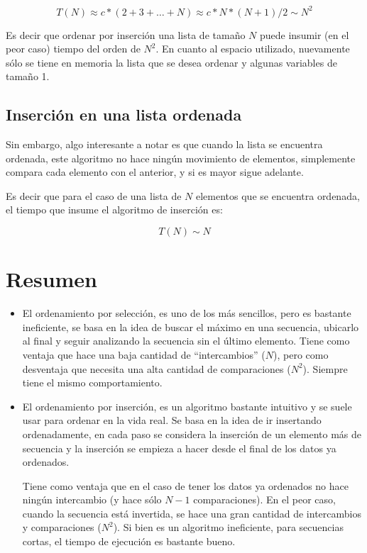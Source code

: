 \begin{equation}
T(N) \approx c * (2 + 3 + \ldots + N) \approx c * N * (N+1)/2 \sim N^2
\end{equation}

Es decir que ordenar por inserción una lista de tamaño $N$ puede insumir
(en el peor caso) tiempo del orden de $N^2$. En cuanto al espacio
utilizado, nuevamente sólo se tiene en memoria la lista que se desea
ordenar y algunas variables de tamaño 1.

\subsection{Inserción en una lista ordenada}

Sin embargo, algo interesante a notar es que cuando la lista se encuentra
ordenada, este algoritmo no hace ningún movimiento de elementos,
simplemente compara cada elemento con el anterior, y si es mayor sigue
adelante.

Es decir que para el caso de una lista de $N$ elementos que se encuentra
ordenada, el tiempo que insume el algoritmo de inserción es:

\begin{equation}
T(N) \sim N
\end{equation}


\section{Resumen}

\begin{itemize}

\item El ordenamiento por selección, es uno de los más sencillos, pero es
bastante ineficiente, se basa en la idea de buscar el máximo en una secuencia,
ubicarlo al final y seguir analizando la secuencia sin el último elemento.
Tiene como ventaja que hace una baja cantidad de ``intercambios'' ($N$), pero
como desventaja que necesita una alta cantidad de comparaciones ($N^2$).
Siempre tiene el mismo comportamiento.

\item El ordenamiento por inserción, es un algoritmo bastante intuitivo y se
suele usar para ordenar en la vida real. Se basa en la idea de ir insertando
ordenadamente, en cada paso se considera la inserción de un elemento más de
secuencia y la inserción se empieza a hacer desde el final de los datos ya
ordenados.

Tiene como ventaja que en el caso de tener los datos ya ordenados no hace
ningún intercambio (y hace sólo $N-1$ comparaciones). En el peor caso, cuando
la secuencia está invertida, se hace una gran cantidad de intercambios y
comparaciones ($N^2$). Si bien es un algoritmo ineficiente, para secuencias
cortas, el tiempo de ejecución es bastante bueno.

\end{itemize}

